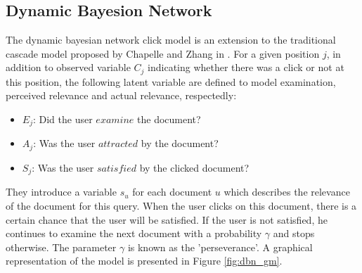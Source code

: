 \subsection{Dynamic Bayesion Network}
The dynamic bayesian network click model is an extension to the traditional cascade model proposed by Chapelle and Zhang in \cite{Zhang2011}. For a given position $j$, in addition to observed variable $C_j$ indicating whether there was a click or not at this position, the following latent variable are defined to model examination, perceived relevance and actual relevance, respectedly:
\begin{itemize}
	\item $E_j$: Did the user $examine$ the document?
	\item $A_j$: Was the user $attracted$ by the document?
	\item $S_j$: Was the user $satisfied$ by the clicked document?
\end{itemize}
They introduce a variable $s_u$ for each document $u$ which describes the relevance of the document for this query. When the user clicks on this document, there is a certain chance that the user will be satisfied. If the user is not satisfied, he continues to examine the next document with a probability $\gamma$ and stops otherwise. The parameter $\gamma$ is known as the 'perseverance'. A graphical representation of the model is presented in Figure \ref{fig:dbn_gm}. 

